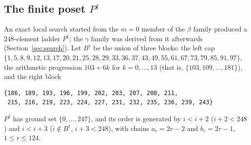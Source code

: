 \documentclass[11pt]{amsart}
\theoremstyle{definition}
\theoremstyle{remark}
\begin{document}
\subsection*{The finite poset $P^\dagger$}
An exact local search started from the $m=0$ member of the $\beta$ family produced a $248$-element ladder $P^\dagger$; the $\gamma$ family was derived from it afterwards (Section~\ref{sec:search}). Let $B^\dagger$ be the union of three blocks: the left cap
$\{1,5,8,9,12,13,17,20,21,25,28,29,33,36,37,43,49,55,61,67,73,79,85,91,97\}$,
the arithmetic progression $103+6k$ for $k=0,\dots,13$ (that is, $\{103,109,\dots,181\}$), and the right block
\begin{lstlisting}[basicstyle=\ttfamily\scriptsize,breaklines=true,breakatwhitespace=true,frame=single,framerule=0.3pt,columns=fullflexible,linewidth=\linewidth]
{186, 189, 193, 196, 199, 202, 203, 207, 208, 211,
 215, 216, 219, 223, 224, 227, 231, 232, 235, 236, 239, 243}
\end{lstlisting}
$P^\dagger$ has ground set $\{0,\dots,247\}$, and its order is generated by $i<i+2$ ($i+2<248$) and $i<i+3$ ($i\notin B^\dagger$, $i+3<248$), with chains $a_r=2r-2$ and $b_r=2r-1$, $1\le r\le124$.
\end{document}
